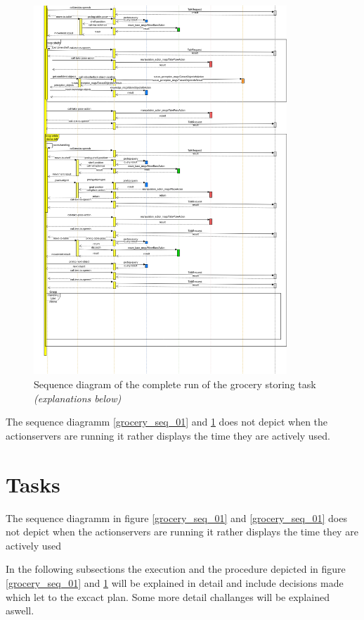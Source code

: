 \documentclass[main.tex]{subfiles}
\begin{document}
		\begin{figure}	
			\centering
			\includegraphics[width=0.85\textwidth]{pictures/diagramms/second-part-grocery-sequence.png}
			\caption{Sequence diagram of the complete run of the grocery storing task \textit{(explanations below)}}
			\label{grocery_seq_02}
		\end{figure}
	
	
		The sequence diagramm \ref{grocery_seq_01} and \ref{grocery_seq_02} does not depict when the actionservers are running it rather displays the time they are actively used.

	\section{Tasks}
		The sequence diagramm in figure \ref{grocery_seq_01} and \ref{grocery_seq_01} does not depict when the actionservers are running it rather displays the time they are actively used	
	
	In the following subsections the execution and the procedure depicted in figure \ref{grocery_seq_01} and \ref{grocery_seq_02} will be explained in detail and include decisions made which let to the excact plan. Some more detail challanges will be explained aswell.
\end{document}
